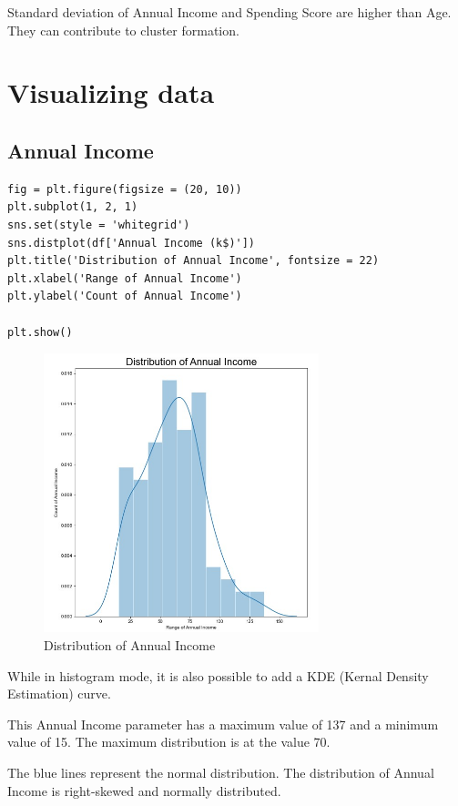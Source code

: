 \documentclass{article}
\begin{document}
Standard deviation of Annual Income and Spending Score are higher than Age.
They can contribute to cluster formation. 

\section{Visualizing data}

\subsection{Annual Income}
\begin{lstlisting}
fig = plt.figure(figsize = (20, 10))
plt.subplot(1, 2, 1)
sns.set(style = 'whitegrid')
sns.distplot(df['Annual Income (k$)'])
plt.title('Distribution of Annual Income', fontsize = 22)
plt.xlabel('Range of Annual Income')
plt.ylabel('Count of Annual Income')

plt.show()
\end{lstlisting}

\begin{figure}[htp]
    \centering
    \includegraphics[width=8cm]{Distribution of Annual Income.jpg}
    \caption{Distribution of Annual Income}
    \label{fig:Distribution of Annual Income}
\end{figure}

While in histogram mode, it is also possible to add a KDE (Kernal Density Estimation) curve.

This Annual Income parameter has a maximum value of 137 and a minimum value of 15. The maximum distribution is at the value 70.

The blue lines represent the normal distribution. The distribution of Annual Income is right-skewed and normally distributed. 
\end{document}
